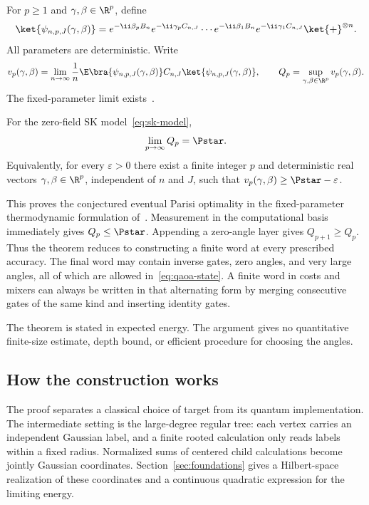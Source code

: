For $p\ge1$ and $\gamma,\beta\in\R^p$, define
\begin{equation}\label{eq:qaoa-state}
 \ket{\psi_{n,p,J}(\gamma,\beta)}
 =e^{-\ii\beta_pB_n}e^{-\ii\gamma_pC_{n,J}}
 \cdots e^{-\ii\beta_1B_n}e^{-\ii\gamma_1C_{n,J}}
 \ket{+}^{\otimes n}.
\end{equation}
All parameters are deterministic. Write
\begin{equation}\label{eq:qaoa-value}
 v_p(\gamma,\beta)=\lim_{n\to\infty}\frac1n
 \E\bra{\psi_{n,p,J}(\gamma,\beta)}C_{n,J}
 \ket{\psi_{n,p,J}(\gamma,\beta)},
 \qquad Q_p=\sup_{\gamma,\beta\in\R^p}v_p(\gamma,\beta).
\end{equation}
The fixed-parameter limit exists~\cite{FGGZ2022,BFMVZ2022}.

\begin{theorem}\label{thm:main}
For the zero-field SK model~\eqref{eq:sk-model},
\begin{equation}\label{eq:main-result}
 \lim_{p\to\infty}Q_p=\Pstar.
\end{equation}
Equivalently, for every $\varepsilon>0$ there exist a finite integer $p$ and
deterministic real vectors $\gamma,\beta\in\R^p$, independent of $n$ and $J$,
such that $v_p(\gamma,\beta)\ge\Pstar-\varepsilon$.
\end{theorem}

This proves the conjectured eventual Parisi optimality in the
fixed-parameter thermodynamic formulation of~\cite{BFMVZ2022}.
Measurement in the computational basis immediately gives $Q_p\le\Pstar$.
Appending a zero-angle layer gives $Q_{p+1}\ge Q_p$. Thus the theorem reduces
to constructing a finite word at every prescribed accuracy. The final word
may contain inverse gates, zero angles, and very large angles, all of which
are allowed in~\eqref{eq:qaoa-state}. A finite word in costs and mixers can
always be written in that alternating form by merging consecutive gates of
the same kind and inserting identity gates.

The theorem is stated in expected energy. The argument gives no
quantitative finite-size estimate, depth bound, or efficient procedure
for choosing the angles.

\subsection{How the construction works}

The proof separates a classical choice of target from its quantum
implementation. The intermediate setting is the large-degree
regular tree: each vertex carries an independent Gaussian label,
and a finite rooted calculation only reads labels within a fixed
radius. Normalized sums of centered child calculations become
jointly Gaussian coordinates. Section~\ref{sec:foundations} gives a
Hilbert-space realization of these coordinates and a continuous
quadratic expression for the limiting energy.

